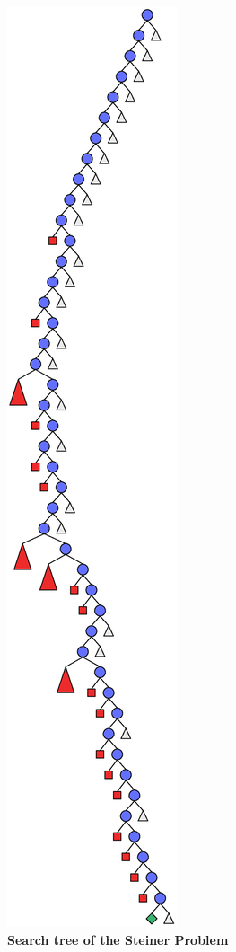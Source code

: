 \documentclass[a4paper]{scrartcl}
\begin{document}
\begin{figure}[htpb]
\centerline{\includegraphics*[scale=0.3]{figs2/steiner1.eps}}
\caption{{\bf Search tree of the Steiner Problem}}
\label{figure 13}
\end{figure}
\end{document}
